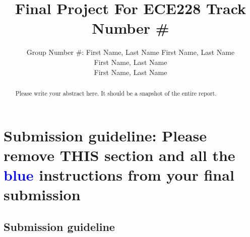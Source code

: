 \documentclass{article}
\title{Final Project For ECE228 Track Number \#}
\author{%
  Group Number \#: First Name, Last Name
  \And
  First Name, Last Name \\
  \And
  First Name, Last Name \\
  \And
  First Name, Last Name \\
}
\begin{document}
\maketitle

\begin{abstract}
Please write your abstract here. It should be a snapshot of the entire report.
\end{abstract}




\section*{Submission guideline: Please remove THIS section and all the \textcolor{blue}{blue} instructions from your final submission}
\subsection*{Submission guideline}
\end{document}
